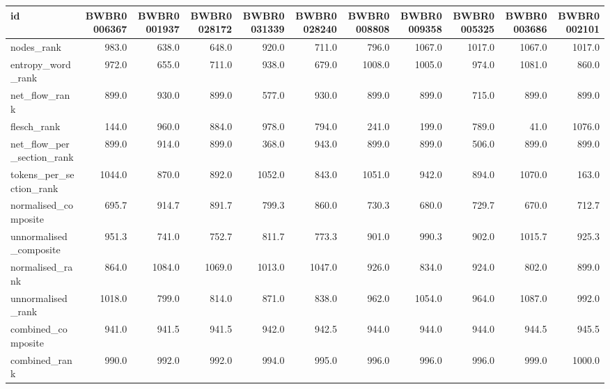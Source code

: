 \begin{tabular}{lrrrrrrrrrr}
\toprule
id & BWBR0006367 & BWBR0001937 & BWBR0028172 & BWBR0031339 & BWBR0028240 & BWBR0008808 & BWBR0009358 & BWBR0005325 & BWBR0003686 & BWBR0002101 \\
\midrule
nodes\_rank & 983.0 & 638.0 & 648.0 & 920.0 & 711.0 & 796.0 & 1067.0 & 1017.0 & 1067.0 & 1017.0 \\
\cline{1-11}
entropy\_word\_rank & 972.0 & 655.0 & 711.0 & 938.0 & 679.0 & 1008.0 & 1005.0 & 974.0 & 1081.0 & 860.0 \\
\cline{1-11}
net\_flow\_rank & 899.0 & 930.0 & 899.0 & 577.0 & 930.0 & 899.0 & 899.0 & 715.0 & 899.0 & 899.0 \\
\cline{1-11}
flesch\_rank & 144.0 & 960.0 & 884.0 & 978.0 & 794.0 & 241.0 & 199.0 & 789.0 & 41.0 & 1076.0 \\
\cline{1-11}
net\_flow\_per\_section\_rank & 899.0 & 914.0 & 899.0 & 368.0 & 943.0 & 899.0 & 899.0 & 506.0 & 899.0 & 899.0 \\
\cline{1-11}
tokens\_per\_section\_rank & 1044.0 & 870.0 & 892.0 & 1052.0 & 843.0 & 1051.0 & 942.0 & 894.0 & 1070.0 & 163.0 \\
\cline{1-11}
normalised\_composite & 695.7 & 914.7 & 891.7 & 799.3 & 860.0 & 730.3 & 680.0 & 729.7 & 670.0 & 712.7 \\
\cline{1-11}
unnormalised\_composite & 951.3 & 741.0 & 752.7 & 811.7 & 773.3 & 901.0 & 990.3 & 902.0 & 1015.7 & 925.3 \\
\cline{1-11}
normalised\_rank & 864.0 & 1084.0 & 1069.0 & 1013.0 & 1047.0 & 926.0 & 834.0 & 924.0 & 802.0 & 899.0 \\
\cline{1-11}
unnormalised\_rank & 1018.0 & 799.0 & 814.0 & 871.0 & 838.0 & 962.0 & 1054.0 & 964.0 & 1087.0 & 992.0 \\
\cline{1-11}
combined\_composite & 941.0 & 941.5 & 941.5 & 942.0 & 942.5 & 944.0 & 944.0 & 944.0 & 944.5 & 945.5 \\
\cline{1-11}
combined\_rank & 990.0 & 992.0 & 992.0 & 994.0 & 995.0 & 996.0 & 996.0 & 996.0 & 999.0 & 1000.0 \\
\cline{1-11}
\bottomrule
\end{tabular}

